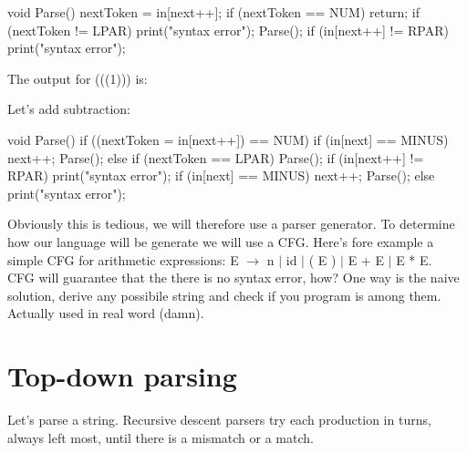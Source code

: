 \documentclass[12pt]{article}
\begin{document}
\begin{mycode}[title= Balanced parentheses parser]
    void Parse() {
        nextToken = in[next++];
        if (nextToken == NUM) return;
    }
    if (nextToken != LPAR) print("syntax error");
    Parse();
    if (in[next++] != RPAR) print("syntax error");
\end{mycode}
The output for (((1))) is:
\\
Let's add subtraction: 
\begin{mycode}[title= Balanced parentheses parser]
    void Parse() {
        if ((nextToken = in[next++]) == NUM) {
            if (in[next] == MINUS) { next++; Parse(); }
        } else if (nextToken == LPAR) {
            Parse();
            if (in[next++] != RPAR) print("syntax error");
            if (in[next] == MINUS) { next++; Parse(); }
        } else print("syntax error");
    }
\end{mycode}
Obviously this is tedious, we will therefore use a parser generator.
To determine how our language will be generate we will 
use a CFG. Here's fore example a simple CFG for arithmetic expressions: E $\rightarrow$ n $|$ id $|$ ( E ) $|$ E + E $|$ E * E.
\\ CFG will guarantee that the there is no syntax error, how? One way is the naive solution, derive any possibile string and check if you program is among them. Actually used in real word (damn).

\section{Top-down parsing}
Let's parse a string. 
Recursive descent parsers try each production in turns, always left most, until there is a mismatch or a match.
\end{document}
